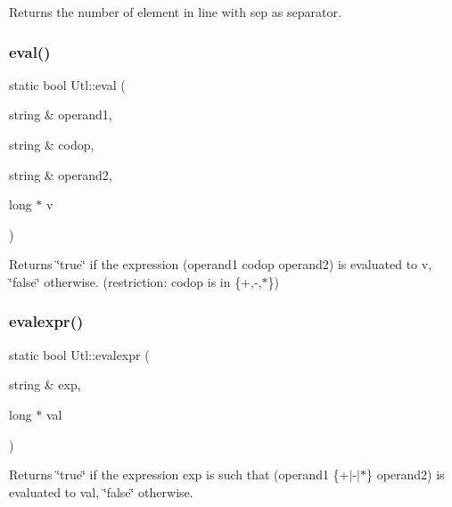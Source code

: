 \begin{DoxyReturn}{Returns}
the number of element in line with sep as separator. 
\end{DoxyReturn}
\mbox{\label{classUtl_a86f1f52bdce8adce83ffc0feaa66bf37}} 
\subsubsection{\texorpdfstring{eval()}{eval()}}
{\footnotesize\ttfamily static bool Utl\+::eval (\begin{DoxyParamCaption}\item[{string \&}]{operand1,  }\item[{string \&}]{codop,  }\item[{string \&}]{operand2,  }\item[{long $\ast$}]{v }\end{DoxyParamCaption})\hspace{0.3cm}{\ttfamily [static]}}

\begin{DoxyReturn}{Returns}
\char`\"{}true\char`\"{} if the expression (operand1 codop operand2) is evaluated to v, \char`\"{}false\char`\"{} otherwise. (restriction\+: codop is in \{+,-\/,$\ast$\}) 
\end{DoxyReturn}
\mbox{\label{classUtl_a299e81b7065a844d70939d287be40e9a}} 
\subsubsection{\texorpdfstring{evalexpr()}{evalexpr()}}
{\footnotesize\ttfamily static bool Utl\+::evalexpr (\begin{DoxyParamCaption}\item[{string \&}]{exp,  }\item[{long $\ast$}]{val }\end{DoxyParamCaption})\hspace{0.3cm}{\ttfamily [static]}}

\begin{DoxyReturn}{Returns}
\char`\"{}true\char`\"{} if the expression exp is such that (operand1 \{+$\vert$-\/$\vert$$\ast$\} operand2) is evaluated to val, \char`\"{}false\char`\"{} otherwise. 
\end{DoxyReturn}
\mbox{\label{classUtl_a957cf4b41bffc4ceacaf115397973472}} 
